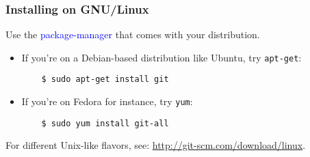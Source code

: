 %
%
\begin{frame}[fragile]
  \frametitle{
    Installing on GNU/Linux
  }

Use the \textcolor{blue}{package-manager} that comes with your distribution.

\begin{itemize}%
\item
  If you're on a Debian-based distribution like Ubuntu, try {\tt apt-get}:
  \begin{lstlisting}
    $ sudo apt-get install git
  \end{lstlisting}
\item
  If you're on Fedora for instance, try {\tt yum}:
  \begin{lstlisting}
    $ sudo yum install git-all
  \end{lstlisting}
\end{itemize}

For different Unix-like flavors, see: \href{http://git-scm.com/download/linux}{http://git-scm.com/download/linux}.

\end{frame}
